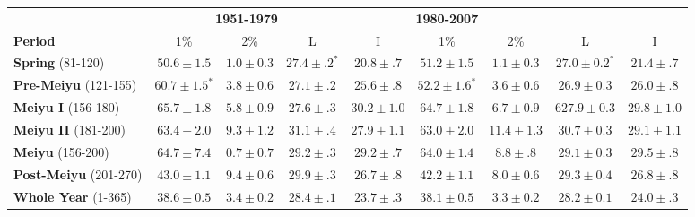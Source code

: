 \documentclass[draft,grl]{AGUTeX}
\begin{document}
\begin{table}
\begin{tabular}{ l c c c c c c c c}
	& \multicolumn{3}{c}{\textbf{1951-1979}} & \multicolumn{3}{c}{\textbf{1980-2007}} \\
	\textbf{Period} & 1\% & 2\% & L & I & 1\% & 2\% & L & I \\
	\hline	
	\textbf{Spring} (81-120) & $50.6 \pm 1.5$ & $1.0 \pm 0.3$ & $\boldsymbol{27.4 \pm .2^*}$ & $20.8 \pm .7$ & $51.2 \pm 1.5$ & $1.1 \pm 0.3$ & $\boldsymbol{27.0 \pm 0.2^*}$ & $21.4 \pm .7$ \\
	\textbf{Pre-Meiyu} (121-155) & $\boldsymbol{60.7 \pm 1.5^*}$ & $3.8 \pm 0.6$ & $27.1 \pm .2$ & $25.6 \pm .8$ & $\boldsymbol{52.2 \pm 1.6^*}$ & $3.6 \pm 0.6$ & $26.9 \pm 0.3$ & $26.0 \pm .8$\\
	\textbf{Meiyu I} (156-180) &	$65.7 \pm 1.8$ & $5.8 \pm 0.9$ & $27.6 \pm .3$ & $30.2 \pm 1.0$ & $64.7 \pm 1.8$  & $6.7 \pm 0.9$ & 6$ 27.9 \pm 0.3$ & $29.8 \pm 1.0$ \\
	\textbf{Meiyu II} (181-200) & $63.4 \pm 2.0$ & $9.3 \pm 1.2$ & $31.1 \pm .4$ & $27.9 \pm 1.1$ & $63.0 \pm 2.0$ & $11.4 \pm 1.3$ & $30.7 \pm 0.3$ & $29.1 \pm 1.1$ \\
	\textbf{Meiyu} (156-200) & $64.7 \pm 7.4$ & $0.7 \pm 0.7$ & $29.2 \pm .3$ & $29.2 \pm .7$ & $64.0 \pm 1.4$ & $8.8 \pm .8$ & $29.1 \pm 0.3$ & $29.5 \pm .8$\\
	\textbf{Post-Meiyu} (201-270) & $43.0 \pm 1.1 $ & $9.4 \pm 0.6$ & $\boldsymbol{29.9 \pm .3}$ & $26.7 \pm .8$ & $42.2 \pm 1.1$ & $8.0 \pm 0.6$ & $\boldsymbol{29.3 \pm 0.4}$ &  $26.8 \pm .8$ \\
	\textbf{Whole Year} (1-365) & $38.6 \pm 0.5 $ & $3.4 \pm 0.2 $ & $\boldsymbol{28.4 \pm .1}$ & $23.7 \pm .3$ & $38.1 \pm 0.5$ & $3.3 \pm 0.2$ & $\boldsymbol{28.2 \pm 0.1} $ & $24.0 \pm .3$\\
\end{tabular}

\end{table}
\end{document}
